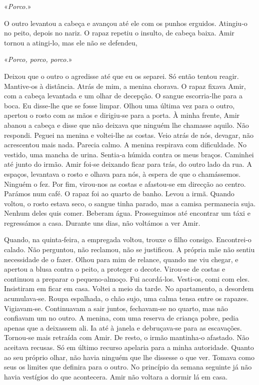 «\emph{Porco.}»

O outro levantou a cabeça e avançou até ele com os punhos erguidos.
Atingiu­‑o no peito, depois no nariz. O rapaz repetiu o insulto, de
cabeça baixa. Amir tornou a atingi­‑lo, mas ele não se defendeu,

«\emph{Porco, porco, porco.}»

Deixou que o outro o agredisse até que eu os separei. Só então tentou
reagir. Mantive­‑os à distância. Atrás de mim, a menina chorava. O rapaz
fixava Amir, com a cabeça levantada e um olhar de decepção. O sangue
escorria­‑lhe para a boca. Eu disse­‑lhe que se fosse limpar. Olhou uma
última vez para o outro, apertou o rosto com as mãos e dirigiu­‑se para
a porta. À minha frente, Amir abanou a cabeça e disse que não deixava
que ninguém lhe chamasse aquilo. Não respondi. Peguei na menina e
voltei­‑lhe as costas. Veio atrás de nós, devagar, não acrescentou mais
nada. Parecia calmo. A menina respirava com dificuldade. No vestido, uma
mancha de urina. Sentia­‑a húmida contra os meus braços. Caminhei até
junto do irmão. Amir foi­‑se deixando ficar para trás, do outro lado da
rua. A espaços, levantava o rosto e olhava para nós, à espera de que o
chamássemos. Ninguém o fez. Por fim, virou­‑nos as costas e afastou­‑se
em direcção ao centro. Parámos num café. O rapaz foi ao quarto de banho.
Levou a irmã. Quando voltou, o rosto estava seco, o sangue tinha parado,
mas a camisa permanecia suja. Nenhum deles quis comer. Beberam água.
Prosseguimos até encontrar um táxi e regressámos a casa. Durante uns
dias, não voltámos a ver Amir.

Quando, na quinta­‑feira, a empregada voltou, trouxe o filho consigo.
Encontrei­‑o calado. Não perguntou, não reclamou, não se justificou. A
própria mãe não sentiu necessidade de o fazer. Olhou para mim de
relance, quando me viu chegar, e apertou a blusa contra o peito, a
proteger o decote. Virou­‑se de costas e continuou a preparar o
pequeno­‑almoço. Fui acordá­‑los. Vesti­‑os, comi com eles. Insistiram
em ficar em casa. Voltei a meio da tarde. No apartamento, a desordem
acumulava­‑se. Roupa espalhada, o chão sujo, uma calma tensa entre os
rapazes. Vigiavam­‑se. Continuavam a sair juntos, fechavam­‑se no
quarto, mas não confiavam um no outro. A menina, com uma reserva de
criança pobre, pedia apenas que a deixassem ali. Ia até à janela e
debruçava­‑se para as escavações. Tornou­‑se mais retraída com Amir. De
resto, o irmão mantinha­‑o afastado. Não aceitava recusas. Só em último
recurso apelaria para a minha autoridade. Quanto ao seu próprio olhar,
não havia ninguém que lhe dissesse o que ver. Tomava como seus os
limites que definira para o outro. No princípio da semana seguinte já
não havia vestígios do que acontecera. Amir não voltara a dormir lá em
casa.


